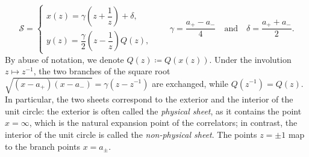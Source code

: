 \documentclass[a4paper,11pt,english]{article}
\theoremstyle{plain}
\theoremstyle{definition}
\theoremstyle{plain}
\begin{document}
\begin{equation}\label{eq:SC}
    \mathcal{S} =
    \begin{cases}
        x(z) = \gamma \left(z + \dfrac{1}{z}\right) + \delta, \\[2ex]
        y(z) = \dfrac{\gamma}{2} \left( z - \dfrac{1}{z} \right) Q(z),
    \end{cases}
    \qquad
    \gamma = \dfrac{a_+ - a_-}{4} \quad\text{and}\quad \delta = \dfrac{a_+ + a_-}{2}.
\end{equation}
By abuse of notation, we denote $Q(z) \coloneqq Q(x(z))$.
Under the involution $z \mapsto z^{-1}$, the two branches of the square root $\sqrt{(x - a_+)(x - a_-)} = \gamma(z - z^{-1})$ are exchanged, while $Q(z^{-1}) = Q(z)$.
In particular, the two sheets correspond to the exterior and the interior of the unit circle: the exterior is often called the \emph{physical sheet}, as it contains the point $x = \infty$, which is the natural expansion point of the correlators; in contrast, the interior of the unit circle is called the \emph{non-physical sheet}.
The points $z = \pm 1$ map to the branch points $x = a_{\pm}$.
\end{document}
